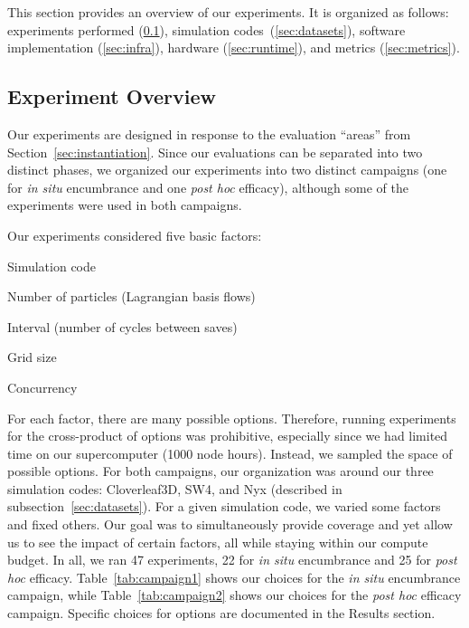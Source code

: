 %
%

This section provides an overview of our experiments.
%
It is organized as follows: 
experiments performed (\ref{sec:experiments}), simulation codes~(\ref{sec:datasets}),
software implementation (\ref{sec:infra}),
hardware (\ref{sec:runtime}),
and metrics (\ref{sec:metrics}).

\subsection{Experiment Overview}
\label{sec:experiments}

Our experiments are designed in response to the evaluation ``areas''
from Section~\ref{sec:instantiation}.
%
Since our evaluations can be separated into two distinct phases, 
we organized our experiments into two distinct campaigns (one for
\textit{in situ} encumbrance and one \textit{post hoc} efficacy),
although some of the
experiments were used in both campaigns.
%

Our experiments considered five basic factors:
\begin{tightItemize}
\item Simulation code
\item Number of particles (Lagrangian basis flows)
\item Interval (number of cycles between saves)
\item Grid size
\item Concurrency
\end{tightItemize}
\noindent
For each factor, there are many possible options.
%
Therefore, running experiments for the cross-product of options
was prohibitive, especially since we had limited time on our supercomputer
(1000 node hours).
%
Instead, we sampled the space of possible options.
%
For both campaigns, our organization was around our three
simulation codes: Cloverleaf3D, SW4, and Nyx 
(described in subsection~\ref{sec:datasets}).
%
For a given simulation code, we varied some factors and fixed others.
%
Our goal was to simultaneously
 provide coverage and yet allow us to see the impact of certain factors,
all while staying within our compute budget.
%
In all, we ran 47 experiments, 22 for \textit{in situ} encumbrance and 25
for \textit{post hoc} efficacy.
%
Table~\ref{tab:campaign1} shows our choices for the \textit{in situ}
encumbrance campaign, while Table~\ref{tab:campaign2} shows
our choices for the \textit{post hoc} efficacy campaign.
%
Specific choices for options 
are documented in the Results section.

